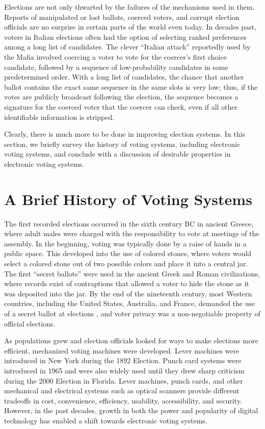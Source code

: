 Elections are not only thwarted by the failures of the mechanisms used in them. Reports of manipulated or lost ballots, coerced voters, and corrupt election officials are no surprise in certain parts of the world even today. In decades past, voters in Italian elections often had the option of selecting ranked preferences among a long list of candidates. The clever ``Italian attack'' \cite{naish:italian-attack} reportedly used by the Mafia involved coercing a voter to vote for the coercer's first choice candidate, followed by a sequence of low-probability candidates in some predetermined order. With a long list of candidates, the chance that another ballot contains the exact same sequence in the same slots is very low; thus, if the votes are publicly broadcast following the election, the sequence becomes a signature for the coerced voter that the coercer can check, even if all other identifiable information is stripped.

Clearly, there is much more to be done in improving election systems. In this section, we briefly survey the history of voting systems, including electronic voting systems, and conclude with a discussion of desirable properties in electronic voting systems.

\section{A Brief History of Voting Systems} \label{intro:history}

The first recorded elections occurred in the sixth century BC in ancient Greece, where adult males were charged with the responsibility to vote at meetings of the assembly. In the beginning, voting was typically done by a raise of hands in a public space. This developed into the use of colored stones, where voters would select a colored stone out of two possible colors and place it into a central jar. The first ``secret ballots'' were used in the ancient Greek and Roman civilizations, where records exist of contraptions that allowed a voter to hide the stone as it was deposited into the jar. By the end of the nineteenth century, most Western countries, including the United States, Australia, and France, demanded the use of a secret ballot at elections \cite{wiki:secret-ballot}, and voter privacy was a non-negotiable property of official elections.

As populations grew and election officials looked for ways to make elections more efficient, mechanized voting machines were developed. Lever machines were introduced in New York during the 1892 Election. Punch card systems were introduced in 1965 and were also widely used until they drew sharp criticism during the 2000 Election in Florida. Lever machines, punch cards, and other mechanical and electrical systems such as optical scanners provide different tradeoffs in cost, convenience, efficiency, usability, accessibility, and security. However, in the past decades, growth in both the power and popularity of digital technology has enabled a shift towards electronic voting systems.

